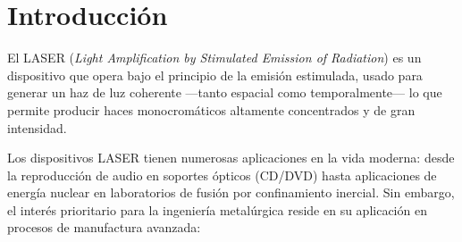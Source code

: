 \documentclass[12pt, a4paper]{article}
\begin{document}
\thispagestyle{plain}
\begin{abstract}
\noindent
Este trabajo explora la aplicación de series numéricas en el cálculo de la ganancia óptica
de una cavidad resonante láser. Se describe el principio de funcionamiento de los láseres,
su estructura física básica y los procesos de emisión espontánea, absorción y emisión
estimulada que gobiernan su operación. Se desarrolla una expresión analítica para la ganancia
umbral a partir del desarrollo en serie de Taylor de la función exponencial, considerando las
pérdidas por reflexión en los espejos de la cavidad. Se demuestra que la aproximación lineal
$e^{-2\alpha L} \approx 1 - 2\alpha L$ está justificada físicamente para la gran mayoría de
láseres industriales de alta reflectividad, y se analiza cuantitativamente el error de
truncamiento. El resultado obtenido,
$\alpha_c = (1 - R_1 R_2)/(2L)$,
es de utilidad directa en el diseño y optimización de láseres de potencia para procesos
metalúrgicos de manufactura avanzada, tales como el sinterizado selectivo por láser (SLM),
la fusión selectiva por láser (DMLS) y el mecanizado láser de alta precisión.

\medskip
\noindent\textbf{Palabras clave:} LASER, cavidad resonante, ganancia óptica, series de Taylor,
condición de umbral, procesos de manufactura láser, ingeniería metalúrgica.
\end{abstract}

\newpage
\tableofcontents
\newpage

\section{Introducción}

El LASER (\textit{Light Amplification by Stimulated Emission of Radiation}) es un dispositivo
que opera bajo el principio de la emisión estimulada, usado para generar un haz de luz
coherente —tanto espacial como temporalmente— lo que permite producir haces monocromáticos
altamente concentrados y de gran intensidad.

Los dispositivos LASER tienen numerosas aplicaciones en la vida moderna: desde la reproducción
de audio en soportes ópticos (CD/DVD) hasta aplicaciones de energía nuclear en laboratorios
de fusión por confinamiento inercial. Sin embargo, el interés prioritario para la ingeniería
metalúrgica reside en su aplicación en procesos de manufactura avanzada:
\end{document}
